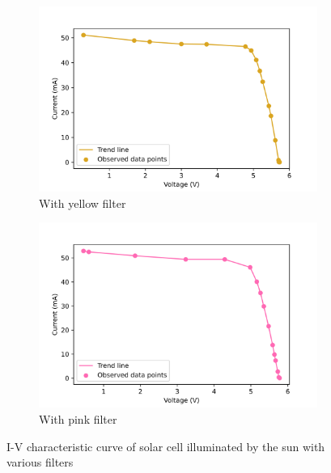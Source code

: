 \documentclass[%
 aip,
 amsmath,amssymb,
 reprint, floatfix%
]{revtex4-2}
\begin{document}
\begin{figure}
\begin{subfigure}[b]{0.49\textwidth}
            \includegraphics[scale = 0.54]{Figures/plot-iv-sun-yellow.png}
            \caption{With yellow filter}
            \label{fig:iv-sun-yellow}
        \end{subfigure}
        \hfill
        \begin{subfigure}[b]{0.49\textwidth}
            \centering
            \includegraphics[scale = 0.54]{Figures/plot-iv-sun-pink.png}
            \caption{With pink filter}
            \label{fig:iv-sun-pink}
        \end{subfigure}
            \caption{I-V characteristic curve of solar cell illuminated by the sun with various filters}
            \label{fig:iv-sun}
    \end{figure}

    
    
\end{document}
